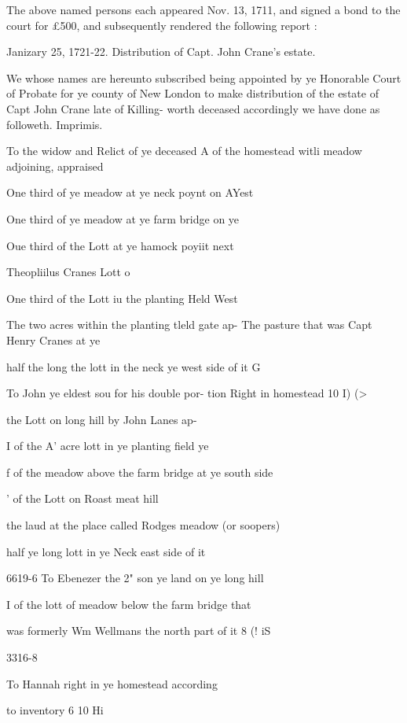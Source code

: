 \documentclass{book}
\begin{document}
The above named persons each appeared Nov. 13, 1711, and 
signed a bond to the court for £500, and subsequently rendered 
the following report : 

Janizary 25, 1721-22. Distribution of Capt. John Crane's 
estate. 

We whose names are hereunto subscribed being appointed by 
ye Honorable Court of Probate for ye county of New London to 
make distribution of the estate of Capt John Crane late of Killing- 
worth deceased accordingly we have done as followeth. 
Imprimis. 

To the widow and Relict of ye deceased A of the 
homestead witli meadow adjoining, appraised 

One third of ye meadow at ye neck poynt on AYest 


One third of ye meadow at ye farm bridge on ye 





Oue third of the Lott at ye hamock poyiit next 

Theopliilus Cranes Lott o   

One third of the Lott iu the planting Held West 


The two acres within the planting tleld gate ap- 
The pasture that was Capt Henry Cranes at ye 


half the long the lott in the neck ye west side of it G   




To John ye eldest sou for his double por- 
tion Right in homestead 10  I)  (> 

the Lott on long hill by John Lanes ap- 

I of the A' acre lott in ye planting field ye 


f of the meadow above the farm bridge at 
ye south side 

' of the Lott on Roast meat hill 

the laud at the place called Rodges meadow 
(or soopers) 

half ye long lott in ye Neck east side of it 

6619-6 
To Ebenezer the 2" son ye land on ye long hill 


I of the lott of meadow below the farm bridge that 

was formerly Wm Wellmans the north part of it 8  (!  iS 


3316-8 

To Hannah right in ye homestead according 

to inventory 6  10  Hi 
\end{document}
